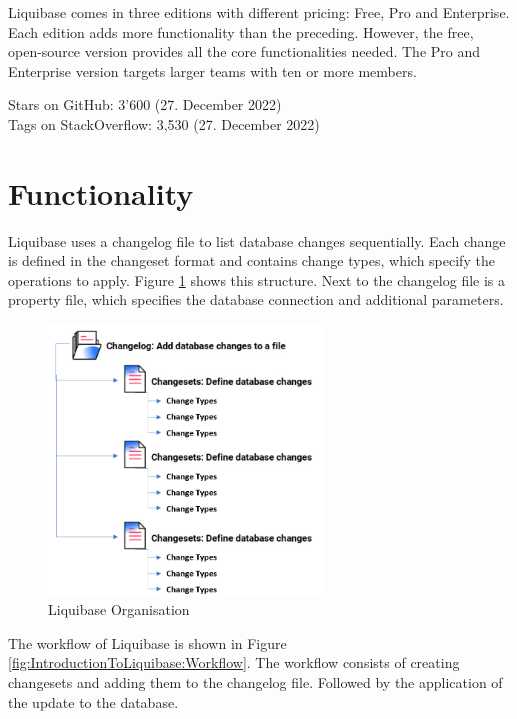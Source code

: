 %
Liquibase \cite{Liquibase} comes in three editions with different pricing: Free, Pro and Enterprise. Each edition adds more functionality than the preceding. However, the free, open-source version provides all the core functionalities needed. The Pro and Enterprise version targets larger teams with ten or more members. 

%
Stars on GitHub: 3'600 (27. December 2022)\\
Tags on StackOverflow: 3,530 (27. December 2022)\\

\section{Functionality}
%
Liquibase uses a changelog file to list database changes sequentially. Each change is defined in the changeset format and contains change types, which specify the operations to apply. Figure \ref{fig:IntroductionToLiquibase:LiquibaseChangelogStructure} shows this structure. Next to the changelog file is a property file, which specifies the database connection and additional parameters.

\begin{figure}[H]
	\centering
	\includegraphics[width=0.65\textwidth]{./chapters/intro_liquibase/images/changelog-structure.png}
	\caption[Liquibase Organisation - Source: \cite{Liquibase}]{Liquibase Organisation}
	\label{fig:IntroductionToLiquibase:LiquibaseChangelogStructure}
\end{figure}

The workflow of Liquibase is shown in Figure \ref{fig:IntroductionToLiquibase:Workflow}. The workflow consists of creating changesets and adding them to the changelog file. Followed by the application of the update to the database. 

